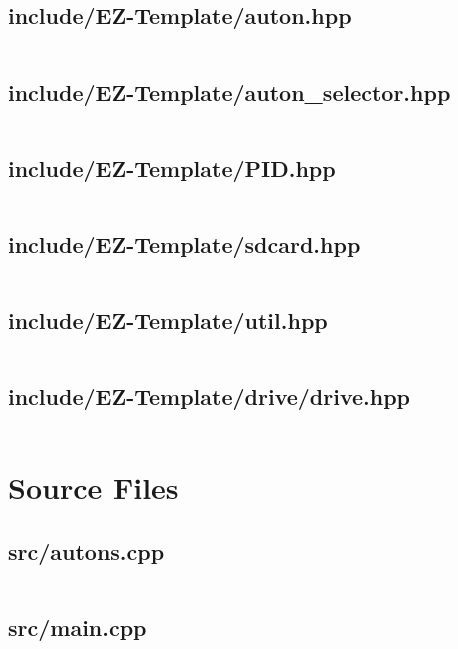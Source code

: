 \subsection{include/EZ-Template/auton.hpp}
\inputminted[linenos,tabsize=2,breaklines, breakanywhere]{c}{auton.hpp}
\pagebreak

\subsection{include/EZ-Template/auton_selector.hpp}
\inputminted[linenos,tabsize=2,breaklines, breakanywhere]{c}{auton_selector.hpp}
\pagebreak

\subsection{include/EZ-Template/PID.hpp}
\inputminted[linenos,tabsize=2,breaklines, breakanywhere]{c}{PID.hpp}
\pagebreak

\subsection{include/EZ-Template/sdcard.hpp}
\inputminted[linenos,tabsize=2,breaklines, breakanywhere]{c}{sdcard.hpp}
\pagebreak

\subsection{include/EZ-Template/util.hpp}
\inputminted[linenos,tabsize=2,breaklines, breakanywhere]{c}{util.hpp}
\pagebreak

\subsection{include/EZ-Template/drive/drive.hpp}
\inputminted[linenos,tabsize=2,breaklines, breakanywhere]{c}{drive.hpp}
\pagebreak

\section{Source Files}

\subsection{src/autons.cpp}
\inputminted[linenos,tabsize=2,breaklines, breakanywhere]{c}{autons.cpp}
\pagebreak

\subsection{src/main.cpp}
\inputminted[linenos,tabsize=2,breaklines, breakanywhere]{c}{main.cpp}
\pagebreak

